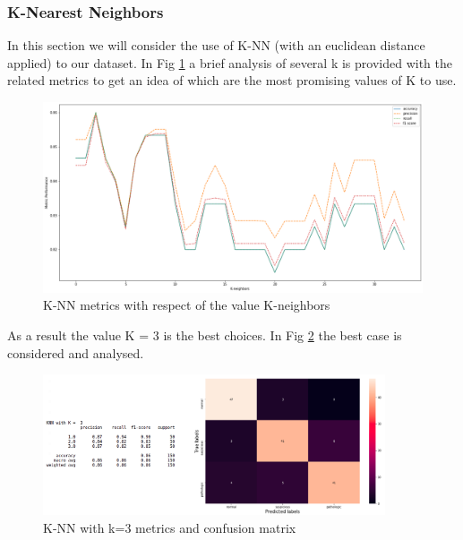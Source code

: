 \documentclass[a4paper,12pt]{article}
\begin{document}
\subsubsection{K-Nearest Neighbors}
In this section we will consider the use of K-NN (with an euclidean distance applied) to our dataset. In Fig \ref{fig:knn} a brief analysis of several k is provided with the related metrics to get an idea of which are the most promising values of K to use.

\begin{figure}[H]
  \begin{center}
  \includegraphics[width=1.0\textwidth]{images/knn.png}
  \end{center}
  \caption{K-NN metrics with respect of the value K-neighbors}
  \label{fig:knn}
\end{figure}

\noindent As a result the value K = 3 is the best choices. In Fig \ref{fig:knn2} the best case is considered and analysed.

\begin{figure}[H]
  \begin{center}
  \includegraphics[width=0.9\textwidth]{images/knn2res.png}
  \end{center}
  \caption{K-NN with k=3 metrics and confusion matrix}
  \label{fig:knn2}
\end{figure}
\end{document}
